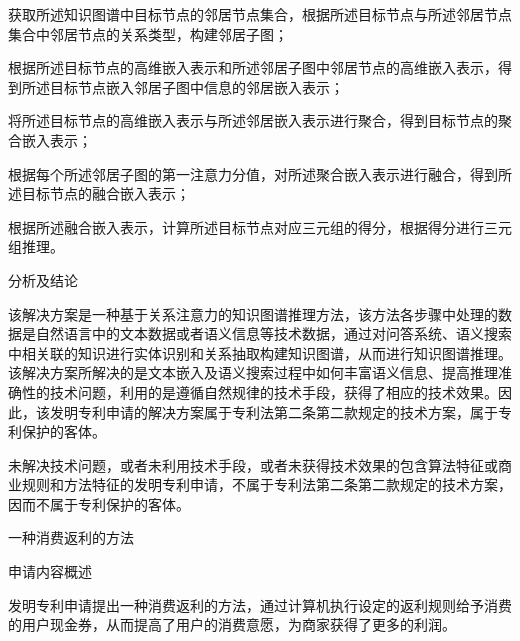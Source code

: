 {\setlength{\parindent}{20.6bp}获取所述知识图谱中目标节点的邻居节点集合，根据所述目标节点与所述邻居节点集合中邻居节点的关系类型，构建邻居子图；\par}

{\setlength{\parindent}{20.6bp}根据所述目标节点的高维嵌入表示和所述邻居子图中邻居节点的高维嵌入表示，得到所述目标节点嵌入邻居子图中信息的邻居嵌入表示；\par}

{\setlength{\parindent}{20.6bp}将所述目标节点的高维嵌入表示与所述邻居嵌入表示进行聚合，得到目标节点的聚合嵌入表示；\par}

{\setlength{\parindent}{20.6bp}根据每个所述邻居子图的第一注意力分值，对所述聚合嵌入表示进行融合，得到所述目标节点的融合嵌入表示；\par}

{\setlength{\parindent}{20.6bp}根据所述融合嵌入表示，计算所述目标节点对应三元组的得分，根据得分进行三元组推理。\par}

{\setlength{\parindent}{20.1bp}分析及结论\par}

{\setlength{\parindent}{20.6bp}该解决方案是一种基于关系注意力的知识图谱推理方法，该方法各步骤中处理的数据是自然语言中的文本数据或者语义信息等技术数据，通过对问答系统、语义搜索中相关联的知识进行实体识别和关系抽取构建知识图谱，从而进行知识图谱推理。该解决方案所解决的是文本嵌入及语义搜索过程中如何丰富语义信息、提高推理准确性的技术问题，利用的是遵循自然规律的技术手段，获得了相应的技术效果。因此，该发明专利申请的解决方案属于专利法第二条第二款规定的技术方案，属于专利保护的客体。\par}

{\setlength{\parindent}{15.3bp}未解决技术问题，或者未利用技术手段，或者未获得技术效果的包含算法特征或商业规则和方法特征的发明专利申请，不属于专利法第二条第二款规定的技术方案，因而不属于专利保护的客体。\par}

{\setlength{\parindent}{15.3bp}\par}

{\setlength{\parindent}{20.6bp}一种消费返利的方法\par}

{\setlength{\parindent}{20.1bp}申请内容概述\par}

{\setlength{\parindent}{20.6bp}发明专利申请提出一种消费返利的方法，通过计算机执行设定的返利规则给予消费的用户现金券，从而提高了用户的消费意愿，为商家获得了更多的利润。\par}

